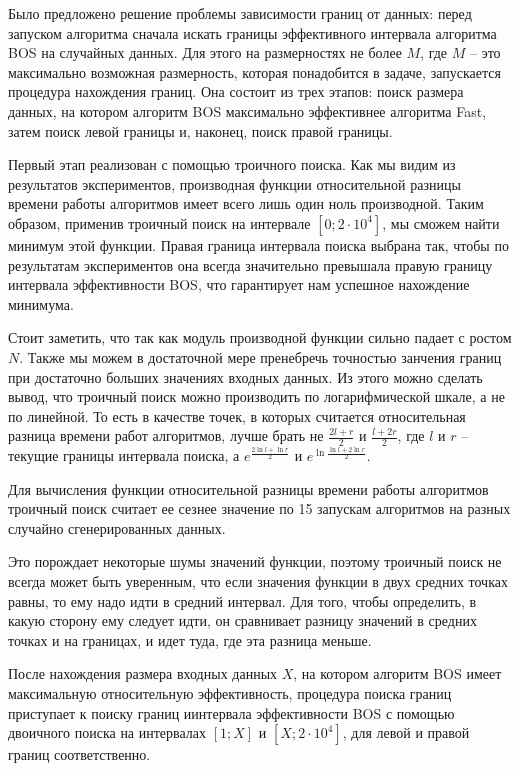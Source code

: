 Было предложено решение проблемы зависимости границ от данных: перед запуском алгоритма сначала искать границы
эффективного интервала алгоритма BOS на случайных данных. Для этого на размерностях не более $M$, где $M$ -- это
максимально возможная размерность, которая понадобится в задаче, запускается процедура нахождения границ. Она состоит
из трех этапов: поиск размера данных, на котором алгоритм BOS максимально эффективнее алгоритма Fast, затем поиск
левой границы и, наконец, поиск правой границы.

Первый этап реализован с помощью троичного поиска. Как мы видим из результатов экспериментов, производная функции
относительной разницы времени работы алгоритмов имеет всего лишь один ноль производной. Таким образом, применив
троичный поиск на интервале $[0; 2 \cdot 10^4]$, мы сможем найти минимум этой функции. Правая граница интервала поиска
выбрана так, чтобы по результатам экспериментов она всегда значительно превышала правую границу интервала
эффективности BOS, что гарантирует нам успешное нахождение минимума.

Стоит заметить, что так как модуль производной функции сильно падает с ростом $N$. Также мы можем в достаточной мере
пренебречь точностью занчения границ при достаточно больших значениях входных данных. Из этого можно сделать вывод,
что троичный поиск можно производить по логарифмической шкале, а не по линейной. То есть в качестве точек, в которых
считается относительная разница времени работ алгоритмов, лучше брать не $\frac{2l + r}{2}$ и $\frac{l + 2r}{2}$, где
$l$ и $r$ -- текущие границы интервала поиска, а $e^{\frac{2\ln l + \ln r}{2}}$ и $e^{\ln\frac{\ln l + 2 \ln r}{2}}$.

Для вычисления функции относительной разницы времени работы алгоритмов троичный поиск считает ее сезнее значение по 15
запускам алгоритмов на разных случайно сгенерированных данных.

Это порождает некоторые шумы значений функции, поэтому троичный поиск не всегда может быть уверенным, что если значения
функции в двух средних точках равны, то ему надо идти в средний интервал. Для того, чтобы определить, в какую сторону
ему следует идти, он сравнивает разницу значений в средних точках и на границах, и идет туда, где эта разница меньше.

После нахождения размера входных данных $X$, на котором алгоритм BOS имеет максимальную относительную эффективность,
процедура поиска границ приступает к поиску границ иинтервала эффективности BOS с помощью двоичного поиска на
интервалах $[1;X]$ и $[X;2\cdot10^4]$, для левой и правой границ соответственно.

